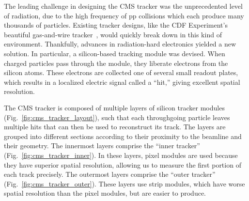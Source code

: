 The leading challenge in designing the CMS tracker was the unprecedented level of radiation, due to the high frequency of pp collisions which each produce many thousands of particles. 
Existing tracker designs, like the CDF Experiment's beautiful gas-and-wire tracker~\cite{CDF:2003xbh}, would quickly break down\footnotemark{} in this kind of environment.
Thankfully, advances in radiation-hard electronics yielded a new solution. 
In particular, a silicon-based tracking module was devised. 
When charged particles pass through the module, they liberate electrons from the silicon atoms. 
These electrons are collected one of several small readout plates, which results in a localized electric signal called a ``hit,'' giving excellent spatial resolution. 

The CMS tracker is composed of multiple layers of silicon tracker modules (Fig.~\ref{fig:cms_tracker_layout}), such that each throughgoing particle leaves multiple hits that can then be used to reconstruct its track. 
The layers are grouped into different sections according to their proximity to the beamline and their geometry. 
The innermost layers comprise the ``inner tracker'' (Fig.~\ref{fig:cms_tracker_inner}). 
In these layers, pixel modules are used because they have superior spatial resolution, allowing us to measure the first portion of each track precisely. 
The outermost layers comprise the ``outer tracker'' (Fig.~\ref{fig:cms_tracker_outer}). 
These layers use strip modules, which have worse spatial resolution than the pixel modules, but are easier to produce. 

